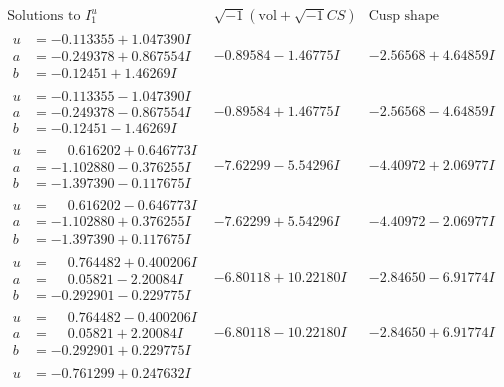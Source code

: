 \documentclass[1p]{elsarticle_modified}
\theoremstyle{definition}
\newcommand{\I}{\sqrt{-1}}
\begin{document}
$$\begin{array}{c|c|c}  
\text{Solutions to }I^u_{1}& \I (\text{vol} + \sqrt{-1}CS) & \text{Cusp shape}\\
 \hline 
\begin{aligned}
u &= -0.113355 + 1.047390 I \\
a &= -0.249378 + 0.867554 I \\
b &= -0.12451 + 1.46269 I\end{aligned}
 & -0.89584 - 1.46775 I & -2.56568 + 4.64859 I \\ \hline\begin{aligned}
u &= -0.113355 - 1.047390 I \\
a &= -0.249378 - 0.867554 I \\
b &= -0.12451 - 1.46269 I\end{aligned}
 & -0.89584 + 1.46775 I & -2.56568 - 4.64859 I \\ \hline\begin{aligned}
u &= \phantom{-}0.616202 + 0.646773 I \\
a &= -1.102880 - 0.376255 I \\
b &= -1.397390 - 0.117675 I\end{aligned}
 & -7.62299 - 5.54296 I & -4.40972 + 2.06977 I \\ \hline\begin{aligned}
u &= \phantom{-}0.616202 - 0.646773 I \\
a &= -1.102880 + 0.376255 I \\
b &= -1.397390 + 0.117675 I\end{aligned}
 & -7.62299 + 5.54296 I & -4.40972 - 2.06977 I \\ \hline\begin{aligned}
u &= \phantom{-}0.764482 + 0.400206 I \\
a &= \phantom{-}0.05821 - 2.20084 I \\
b &= -0.292901 - 0.229775 I\end{aligned}
 & -6.80118 + 10.22180 I & -2.84650 - 6.91774 I \\ \hline\begin{aligned}
u &= \phantom{-}0.764482 - 0.400206 I \\
a &= \phantom{-}0.05821 + 2.20084 I \\
b &= -0.292901 + 0.229775 I\end{aligned}
 & -6.80118 - 10.22180 I & -2.84650 + 6.91774 I \\ \hline\begin{aligned}
u &= -0.761299 + 0.247632 I \\

\end{aligned}
\end{array}$$
\end{document}
